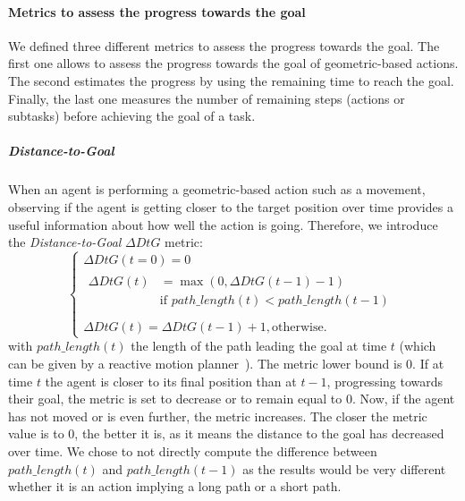 \documentclass[a4paper,11pt,twoside]{StyleThese}
\begin{document}
\paragraph{Metrics to assess the progress towards the goal}

We defined three different metrics to assess the progress towards the goal. The first one allows to assess the progress towards the goal of geometric-based actions. The second estimates the progress by using the remaining time to reach the goal. Finally, the last one measures the number of remaining steps (actions or subtasks) before achieving the goal of a task.

\subparagraph{Distance-to-Goal}\label{para:dtg_gd} 
When an agent is performing a geometric-based action such as a movement, observing if the agent is getting closer to the target position over time provides a useful information about how well the action is going. Therefore, we introduce the \textit{Distance-to-Goal} $\Delta DtG$ metric: 
\begin{equation}\label{eq:dtgg}
\left\{
\begin{array}{ll}
\Delta DtG(t=0) = 0\\
\begin{aligned}
\Delta DtG(t) &= \max(0,\Delta DtG(t-1) - 1)  \\&\text{if } path\_length(t) <  path\_length(t-1) \\

\end{aligned}\\
\Delta DtG(t)= \Delta DtG(t-1) + 1, \text{otherwise.}

\end{array}
\right.
\end{equation}
with $path\_length(t)$ the length of the path leading the goal at time $t$ (\eg which can be given by a reactive motion planner~\citep{khamb2019}). The metric lower bound is 0. If at time $t$ the agent is closer to its final position than at $t-1$, \ie progressing towards their goal, the metric is set to decrease or to remain equal to 0. Now, if the agent has not moved or is even further, the metric increases. The closer the metric value is to 0, the better it is, as it means the distance to the goal has decreased over time. We chose to not directly compute the difference between  $path\_length(t)$ and  $path\_length(t-1)$ as the results would be very different whether it is an action implying a long path or a short path. 
\end{document}
